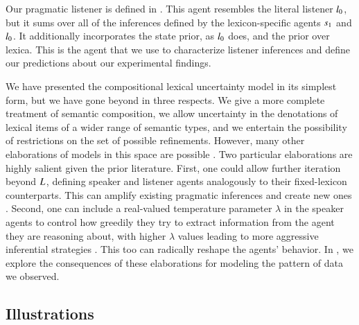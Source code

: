 \documentclass[leqno,12pt]{article}
\begin{document}
Our pragmatic listener is defined in . This agent
resembles the literal listener $l_{0}$, but it sums over all
of the inferences defined by the lexicon-specific agents $s_{1}$
and $l_{0}$. It additionally incorporates the state prior, as
$l_{0}$ does, and the prior over lexica.  This is the agent
that we use to characterize listener inferences and define our
predictions about our experimental findings.


We have presented the compositional lexical uncertainty model in its
simplest form, but we have gone beyond
\citeauthor{Bergen:Levy:Goodman:2014} in three respects. We give a
more complete treatment of semantic composition, we allow uncertainty
in the denotations of lexical items of a wider range of semantic
types, and we entertain the possibility of restrictions on the set of
possible refinements.  However, many other elaborations of models in
this space are possible \citep{Goodman:Lassiter:2013,
  Smith:Goodman:Frank:2013, Kao-etal:2014,Potts:Levy:2015}.  Two
particular elaborations are highly salient given the prior literature.
First, one could allow further iteration beyond
$L_{}$, defining speaker and listener agents
analogously to their fixed-lexicon counterparts. This can amplify
existing pragmatic inferences and create new ones
\citep{Bergen:Levy:Goodman:2014,Vogel-etal:2014,Potts:Levy:2015}.
Second, one can include a real-valued temperature parameter $\lambda$
in the speaker agents to control how greedily they try to extract
information from the agent they are reasoning about, with higher
$\lambda$ values leading to more aggressive inferential strategies
\citep{Sutton:Barto:1998}. This too can radically reshape the agents'
behavior. In , we explore the
consequences of these elaborations for modeling the pattern of data we
observed.


\subsection{Illustrations}\label{sec:illustrations}
\end{document}
